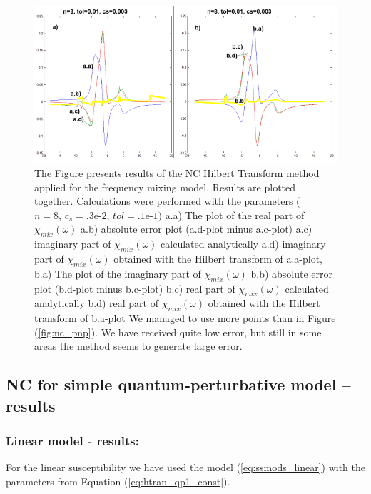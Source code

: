 \documentclass[12pt,twoside,a4paper]{article}
\numberwithin{equation}{subsection}
\numberwithin{figure}{subsection}
\begin{document}
\begin{figure} 
  \includegraphics[width=150mm]{img/nc_fmix1.png}
  \caption{ The Figure presents results of the NC Hilbert Transform method applied for the frequency mixing model. Results are plotted together. Calculations were performed with the parameters ($n = 8, \, c_s = \mbox{.3e-2}, \, tol = \mbox{.1e-1})$
     a.a) The plot of the real part of ${\chi_{mix}}(\omega )$
     a.b) absolute error plot (a.d-plot minus a.c-plot) 
     a.c) imaginary part of ${\chi_{mix}}(\omega )$ calculated analytically 
     a.d) imaginary part of ${\chi_{mix}}(\omega )$ obtained with the Hilbert transform of a.a-plot, 
     b.a) The plot of the imaginary part of ${\chi_{mix}}(\omega )$ 
     b.b) absolute error plot (b.d-plot minus b.c-plot) 
     b.c) real part of $\chi_{mix} (\omega )$ calculated analytically 
     b.d) real part of ${\chi_{mix}}(\omega )$ obtained with the Hilbert transform of b.a-plot
     We managed to use more points than in Figure (\ref{fig:nc_pnp}). We have received quite low error, but still in some areas the method seems to generate large error.
     \label{fig:nc_fmix1}
     }
\end{figure}

\subsection{NC for simple quantum-perturbative model -- results} \label{chap:nc_quantum}

\subsubsection*{Linear model - results:}

For the linear susceptibility we have used the model (\ref{eq:ssmods_linear}) with the parameters from Equation (\ref{eq:htran_qp1_const}).
\end{document}
